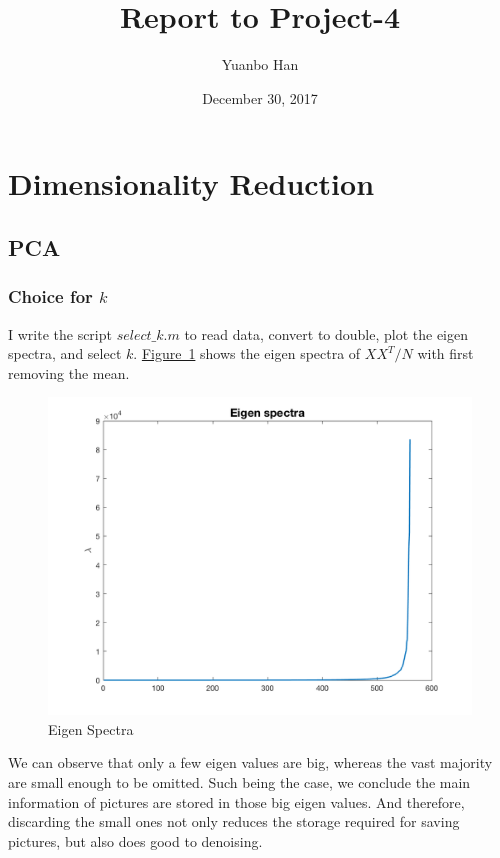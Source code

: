 \documentclass{article}
\title{Report to Project-4}
\author{Yuanbo Han\quad15300180032}
\date{December 30, 2017}
\begin{document}
\maketitle
\tableofcontents

\section{Dimensionality Reduction}
\subsection{PCA}
\subsubsection{Choice for $k$}
\label{sec-1.1.1}
I write the script $select\_k.m$ to read data, convert to double, plot the eigen spectra, and select $k$. \hyperref[fig-1]{Figure~1} shows the eigen spectra of $XX^T/N$ with first removing the mean.

\begin{figure}
	\centering
	\includegraphics[scale=0.3]{eigenspectra.png}
	\caption{Eigen Spectra}
	\label{fig-1}
\end{figure}

We can observe that only a few eigen values are big, whereas the vast majority are small enough to be omitted. Such being the case, we conclude the main information of pictures are stored in those big eigen values. And therefore, discarding the small ones not only reduces the storage required for saving pictures, but also does good to denoising.
\end{document}
